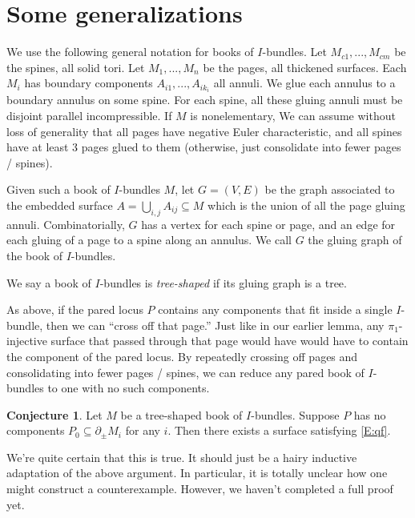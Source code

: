\documentclass[12pt]{amsart}
\theoremstyle{definition}
\newtheorem{conj}[theorem]{Conjecture}
\theoremstyle{remark}
\newcommand{\bd}{\partial}
\newcommand{\cin}{\subseteq}
\begin{document}
{\tiny

\section{Some generalizations}

We use the following general notation for books of $I$-bundles. Let
$M_{c1},...,M_{cm}$ be the spines, all solid tori. Let $M_1,...,M_n$ be the
pages, all thickened surfaces. Each $M_i$ has boundary components
$A_{i1},...,A_{ik_i}$ all annuli. We glue each annulus to a boundary annulus on
some spine. For each spine, all these gluing annuli must be disjoint parallel
incompressible. If $M$ is nonelementary, We can assume without loss of
generality that all pages have negative Euler characteristic, and all spines
have at least 3 pages glued to them (otherwise, just consolidate into fewer
pages / spines).

Given such a book of $I$-bundles $M$, let $G=(V,E)$ be the graph associated to
the embedded surface $A = \bigcup_{i,j} A_{ij} \cin M$ which is the union of
all the page gluing annuli. Combinatorially, $G$ has a vertex for each spine or
page, and an edge for each gluing of a page to a spine along an annulus. We
call $G$ the gluing graph of the book of $I$-bundles.

We say a book of $I$-bundles is \emph{tree-shaped} if its gluing graph is
a tree.

As above, if the pared locus $P$ contains any components that fit inside
a single $I$-bundle, then we can ``cross off that page.'' Just like in our
earlier lemma, any $\pi_1$-injective surface that passed through that page
would have would have to contain the component of the pared locus. By
repeatedly crossing off pages and consolidating into fewer pages / spines, we
can reduce any pared book of $I$-bundles to one with no such components.

\begin{conj}

Let $M$ be a tree-shaped book of $I$-bundles. Suppose $P$ has no components
$P_0\cin \bd_\pm M_i$ for any $i$. Then there exists a surface satisfying
\eqref{E:qf}.

\end{conj}

We're quite certain that this is true. It should just be a hairy inductive
adaptation of the above argument. In particular, it is totally unclear how one
might construct a counterexample. However, we haven't completed a full proof
yet.

}
\end{document}
